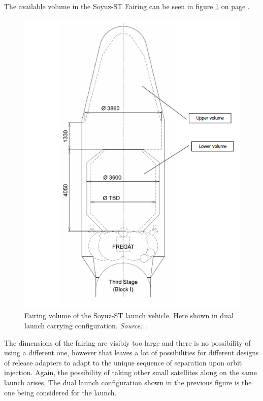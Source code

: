 The available volume in the Soyuz-ST Fairing can be seen in figure \ref{fig:soyuzvol} on page \pageref{fig:soyuzvol}.

\begin{figure}[!h]
\centering
\includegraphics[scale = 0.5, angle=0]{chapters/img/soyuzvol.png}
\caption{Fairing volume of the Soyuz-ST launch vehicle. Here shown in dual launch carrying configuration.\emph{ Source: \cite{soyuzman}.}}
\label{fig:soyuzvol}
\end{figure} 

The dimensions of the fairing are visibly too large and there is no possibility of using a different one, however that leaves a lot of possibilities for different designs of release adapters to adapt to the unique sequence of separation upon orbit injection. Again, the possibility of taking other small satellites along on the same launch arises. The dual launch configuration shown in the previous figure is the one being considered for the launch.


